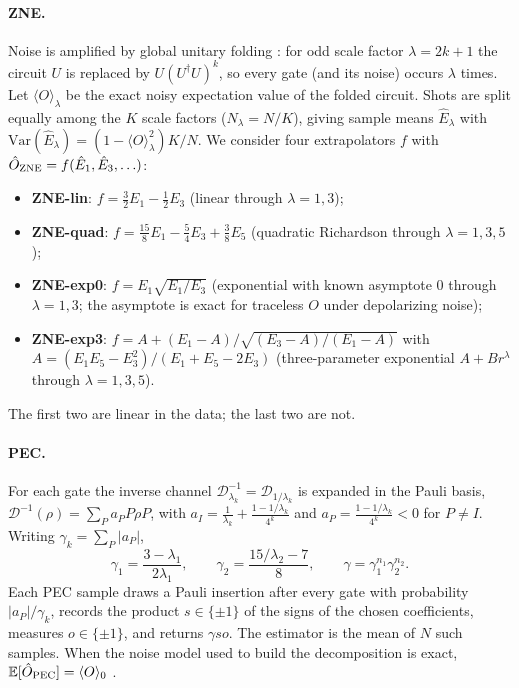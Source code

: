 \documentclass[aps,pra,reprint,amsmath,amssymb,nofootinbib,superscriptaddress]{revtex4-2}
\theoremstyle{remark}
\newcommand{\E}{\mathbb{E}}
\newcommand{\Var}{\mathrm{Var}}
\begin{document}
\paragraph{ZNE.} Noise is amplified by global unitary folding \cite{giurgicatiron2020}: for odd scale factor $\lambda=2k+1$ the circuit $U$ is replaced by $U(U^\dagger U)^k$, so every gate (and its noise) occurs $\lambda$ times. Let $\langle O\rangle_\lambda$ be the exact noisy expectation value of the folded circuit. Shots are split equally among the $K$ scale factors ($N_\lambda = N/K$), giving sample means $\hat E_\lambda$ with $\Var(\hat E_\lambda)=(1-\langle O\rangle_\lambda^2)K/N$. We consider four extrapolators $f$ with $\hat O_{\rm ZNE}=f(\hat E_1,\hat E_3,\ldots)$:
\begin{itemize}
\item \textbf{ZNE-lin}: $f=\tfrac32 E_1-\tfrac12 E_3$ (linear through $\lambda=1,3$);
\item \textbf{ZNE-quad}: $f=\tfrac{15}{8}E_1-\tfrac54 E_3+\tfrac38 E_5$ (quadratic Richardson through $\lambda=1,3,5$);
\item \textbf{ZNE-exp0}: $f=E_1\sqrt{E_1/E_3}$ (exponential with known asymptote $0$ through $\lambda=1,3$; the asymptote is exact for traceless $O$ under depolarizing noise);
\item \textbf{ZNE-exp3}: $f=A+(E_1-A)/\sqrt{(E_3-A)/(E_1-A)}$ with $A=(E_1E_5-E_3^2)/(E_1+E_5-2E_3)$ (three-parameter exponential $A+Br^\lambda$ through $\lambda=1,3,5$).
\end{itemize}
The first two are linear in the data; the last two are not.

\paragraph{PEC.} For each gate the inverse channel $\mathcal D_{\lambda_k}^{-1}=\mathcal D_{1/\lambda_k}$ is expanded in the Pauli basis, $\mathcal D^{-1}(\rho)=\sum_P a_P P\rho P$, with $a_I = \tfrac1{\lambda_k}+\tfrac{1-1/\lambda_k}{4^k}$ and $a_P=\tfrac{1-1/\lambda_k}{4^k}<0$ for $P\neq I$. Writing $\gamma_k=\sum_P|a_P|$,
\begin{equation}
\gamma_1=\frac{3-\lambda_1}{2\lambda_1},\qquad \gamma_2=\frac{15/\lambda_2-7}{8},\qquad
\gamma = \gamma_1^{n_1}\gamma_2^{n_2}.
\label{eq:gamma}
\end{equation}
Each PEC sample draws a Pauli insertion after every gate with probability $|a_P|/\gamma_k$, records the product $s\in\{\pm1\}$ of the signs of the chosen coefficients, measures $o\in\{\pm1\}$, and returns $\gamma s o$. The estimator is the mean of $N$ such samples. When the noise model used to build the decomposition is exact, $\E[\hat O_{\rm PEC}]=\langle O\rangle_0$ \cite{temme2017}.
\end{document}
